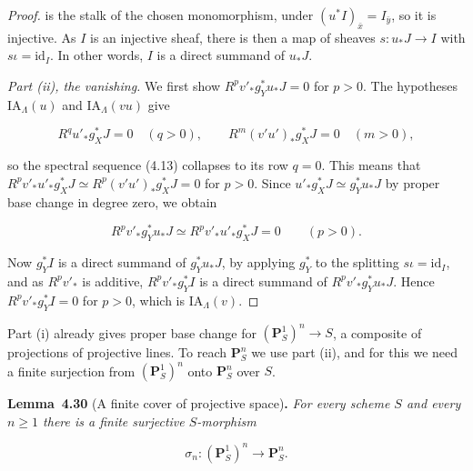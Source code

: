 \documentclass[11pt]{article}
\newenvironment{bpstatement}[2]{\par\addvspace{0.6\baselineskip}\noindent\textbf{#1}#2\textbf{.}\enspace\ignorespaces}
  {\par\addvspace{0.4\baselineskip}}
\newenvironment{bpstatementit}[2]{\begin{bpstatement}{#1}{#2}\itshape\ignorespaces}{\end{bpstatement}}
\begin{document}
\begin{proof}[{Proof}]
is the stalk of the chosen monomorphism, under \((u^*I)_{\bar x}=I_{\bar y}\), so it is injective. As \(I\) is an injective sheaf, there is then a map of sheaves \(s:u_*J\to I\) with \(s\iota=\mathrm{id}_I\). In other words, \(I\) is a direct summand of \(u_*J\).

\emph{Part (ii), the vanishing.} We first show \(R^pv'_*g_Y^*u_*J=0\) for \(p>0\). The hypotheses \(\mathrm{IA}_\Lambda(u)\) and \(\mathrm{IA}_\Lambda(vu)\) give

\[
R^qu'_*g_X^*J=0\quad(q>0),\qquad
R^m(v'u')_*g_X^*J=0\quad(m>0),
\]

so the spectral sequence (4.13) collapses to its row \(q=0\). This means that \(R^pv'_*u'_*g_X^*J\simeq R^p(v'u')_*g_X^*J=0\) for \(p>0\). Since \(u'_*g_X^*J\simeq g_Y^*u_*J\) by proper base change in degree zero, we obtain

\[
R^pv'_*g_Y^*u_*J
\simeq R^pv'_*u'_*g_X^*J=0\qquad(p>0).
\]

Now \(g_Y^*I\) is a direct summand of \(g_Y^*u_*J\), by applying \(g_Y^*\) to the splitting \(s\iota=\mathrm{id}_I\), and as \(R^pv'_*\) is additive, \(R^pv'_*g_Y^*I\) is a direct summand of \(R^pv'_*g_Y^*u_*J\). Hence \(R^pv'_*g_Y^*I=0\) for \(p>0\), which is \(\mathrm{IA}_\Lambda(v)\).
\end{proof}

\label{bp371}%
Part (i) already gives proper base change for \((\mathbf P^1_S)^n\to S\), a composite of projections of projective lines. To reach \(\mathbf P^n_S\) we use part (ii), and for this we need a finite surjection from \((\mathbf P^1_S)^n\) onto \(\mathbf P^n_S\) over \(S\).

\label{bp372}%
\begin{bpstatementit}{Lemma~4.30}{ (A finite cover of projective space)}
For every scheme \(S\) and every \(n\geq1\) there is a finite surjective \(S\)-morphism

\[
\sigma_n:(\mathbf P^1_S)^n\longrightarrow\mathbf P^n_S.
\]
\end{bpstatementit}
\end{document}
